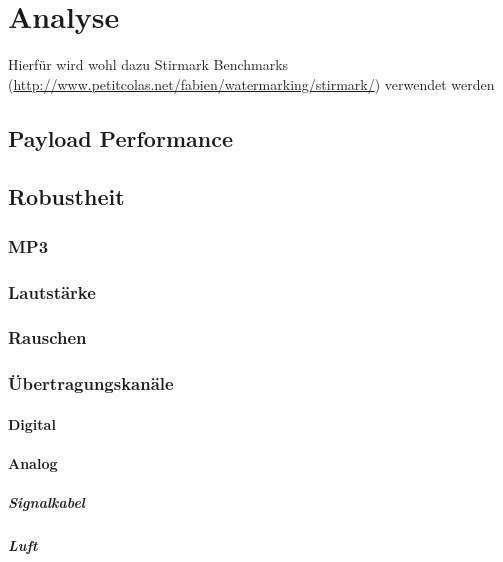 \chapter{Analyse}
\label{ch:analyse}

Hierfür wird wohl dazu Stirmark Benchmarks\cite{petitcolas2000watermarking}\cite{petitcolas2004stirmark} (\url{http://www.petitcolas.net/fabien/watermarking/stirmark/}) verwendet werden

\section{Payload Performance}
\label{sec:payloadperformance}

\section{Robustheit}

\subsection{MP3}

\subsection{Lautstärke}

\subsection{Rauschen}

\subsection{Übertragungskanäle}

\subsubsection{Digital}

\subsubsection{Analog}

\paragraph{Signalkabel}

\paragraph{Luft}






